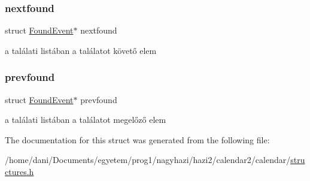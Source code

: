 \subsubsection{\texorpdfstring{nextfound}{nextfound}}
{\footnotesize\ttfamily struct \hyperlink{struct_found_event}{Found\+Event}$\ast$ nextfound}

a találati listában a találatot követő elem \mbox{\label{struct_found_event_add29159b298db5eb8c68bd9314e7c498}} 
\subsubsection{\texorpdfstring{prevfound}{prevfound}}
{\footnotesize\ttfamily struct \hyperlink{struct_found_event}{Found\+Event}$\ast$ prevfound}

a találati listában a találatot megelőző elem 

The documentation for this struct was generated from the following file\+:\begin{DoxyCompactItemize}
\item 
/home/dani/\+Documents/egyetem/prog1/nagyhazi/hazi2/calendar2/calendar/\hyperlink{structures_8h}{structures.\+h}\end{DoxyCompactItemize}
